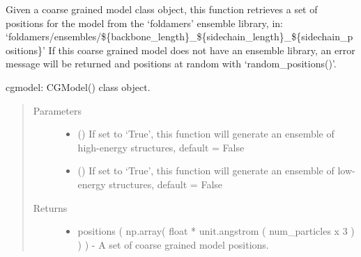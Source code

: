 \documentclass[letterpaper,12pt,english,openany,oneside]{sphinxmanual}
\begin{document}
\begin{fulllineitems}
\label{\detokenize{utilities:utilities.util.get_structure_from_library}}
Given a coarse grained model class object, this function retrieves
a set of positions for the model from the ‘foldamers’ ensemble library, in:
‘foldamers/ensembles/\$\{backbone\_length\}\_\$\{sidechain\_length\}\_\$\{sidechain\_positions\}’
If this coarse grained model does not have an ensemble library, an 
error message will be returned and positions at random with ‘random\_positions()’.

cgmodel: CGModel() class object.
\begin{quote}\begin{description}
\item[{Parameters}] \leavevmode\begin{itemize}
\item {} 
 () \textendash{} If set to ‘True’, this function will generate an ensemble of high-energy structures, default = False

\item {} 
 () \textendash{} If set to ‘True’, this function will generate an ensemble of low-energy structures, default = False

\end{itemize}

\item[{Returns}] \leavevmode
\begin{itemize}
\item {} 
positions ( np.array( float * unit.angstrom ( num\_particles x 3 ) ) ) - A set of coarse grained model positions.

\end{itemize}


\end{description}\end{quote}

\end{fulllineitems}

\end{document}
